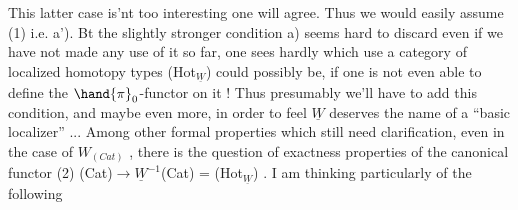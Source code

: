 This latter case is'nt too interesting one will agree.  Thus we
would easily assume (1) i.e. a'). Bt the slightly stronger condition
a) seems hard to discard\over{,}{;} even if we have not made any use of it so far,
one sees hardly  which use a category of localized homotopy types (Hot$_{\underline{W}}$)
could possibly be, if one is not even able to define the $\hand{\pi}_0$-functor on
it ! Thus presumably we'll have to add this condition, and maybe even
more, in order to feel $\underline{W}$ deserves the name of a ``basic localizer'' ...
Among other formal properties which still need clarification, even in 
the case of $W_{(Cat)}$\hand{,} , there is the question of exactness properties
of the canonical functor
(2) \qquad (Cat)$\longrightarrow \underline{W}^{-1}$(Cat) = (Hot$_{\underline{W}}$) .
I am thinking particularly of the following

